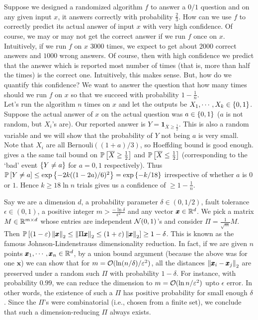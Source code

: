 \begin{ex}
Suppose we designed a randomized algorithm $f$ to answer a $0/1$ question and on any given input $x$, it answers correctly with probability $\frac23$. How can we use $f$ to correctly predict its actual answer of input $x$ with very high confidence. Of course, we may or may not get the correct answer if we run $f$ once on $x$. Intuitively, if we run $f$ on $x$ $3000$ times, we expect to get about $2000$ correct answers and $1000$ wrong answers. Of course, then with high confidence we predict that the answer which is reported most number of times (that is, more than half the times) is the correct one. Intuitively, this makes sense. But, how do we quantify this confidence? We want to answer the question that how many times should we run $f$ on $x$ so that we succeed with probability $1-\frac 1n$. \\
Let's run the algorithm $n$ times on $x$ and let the outputs be $X_{1},\cdots, X_{k}\in \set{0,1}$. Suppose the actual answer of $x$ on the actual question was $a\in \set{0,1}$ ($a$ is not random, but $X_{i}$'s are). Our reported answer is $Y=\pmb 1_{\overline X \ge \frac12}$. This is also a random variable and we will show that the probability of $Y$ not being $a$ is very small. Note that $X_{i}$ are all Bernouli$((1+a)/3)$, so Hoeffding bound is good enough.  gives a the same tail bound on $\P{\overline X\ge\frac12}$ and $\P{\overline X\le\frac12}$ (corresponding to the `bad' event $\set{Y\ne a}$ for $a=0,1$ respectively). Thus $\P{Y\ne a} \le \exp\set{-2k((1-2a)/6)^{2}} = \exp\set{-k/18}$ irrespective of whether $a$ is $0$ or $1$. Hence $k\ge 18\ln n$ trials gives us a confidence of $\ge 1-\frac1n$.
\end{ex}

\begin{ex}
Say we are a dimension $d$, a probability parameter $\delta\in(0,1/2)$, fault tolerance $\epsilon\in(0,1)$, a positive integer $m > \frac{-\ln \delta}{\epsilon^{2}}$ and any vector $\pmb x\in \R^{d}$. We pick a matrix $M \in \R^{m\times d}$ whose entries are independent $\cN(0,1)$'s and consider $\Pi = \frac{1}{\sqrt m}M$. Then 
$\ds \P{(1-\epsilon)\norm{\pmb x}{2} \le \norm{\Pi \pmb x}{2} \le (1+\epsilon)\norm{\pmb x}{2}} \ge 1-\delta$. This is known as the famous Johnson-Lindenstrauss dimensionality reduction. In fact, if we are given $n$ points $\pmb x_{1},\cdots, \pmb x_{n}\in \R^{d}$, by a union bound argument (because the above was for one $\pmb x$) we can show that for $m = \cO(\ln(n/\delta)/\epsilon^{2})$, all the distances $\norm{\pmb x_{i}-\pmb x_{j}}{2}$ are preserved under a random such $\Pi$ with probability $1-\delta$. For instance, with probability $0.99$, we can reduce the dimension to $m = \cO(\ln n/\epsilon^{2})$ upto $\epsilon$ error. In other words, the existence of such a $\Pi$ has positive probability for small enough $\delta$. Since the $\Pi$'s were combinatorial (i.e., chosen from a finite set), we conclude that such a dimension-reducing $\Pi$ always exists.
\end{ex}



